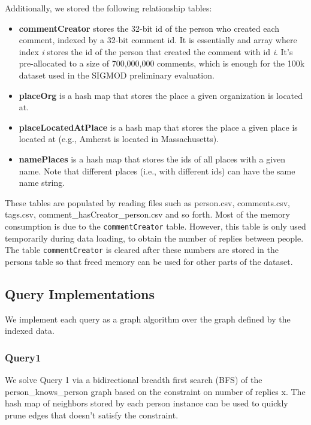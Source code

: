 \documentclass{article}
\begin{document}
Additionally, we stored the following relationship tables: 

\begin{itemize}
\item \textbf{commentCreator} stores the 32-bit id of the person who created each comment, indexed by a 32-bit comment id. It is essentially and array where index \emph{i} stores the id of the person that created the comment with id \emph{i}. It's pre-allocated to a size of 700,000,000 comments, which is enough for the 100k dataset used in the SIGMOD preliminary evaluation. 
\item \textbf{placeOrg} is a hash map that stores the place a given organization is located at.  
\item \textbf{placeLocatedAtPlace} is a hash map that stores the place a given place is located at (e.g., Amherst is located in Massachusetts).  
\item \textbf{namePlaces} is a hash map that stores the ids of all places with a given name. Note that different places (i.e., with different ids) can have the same name string.
\end{itemize}

These tables are populated by reading files such as person.csv,
comments.csv, tags.csv, comment\_hasCreator\_person.csv and so forth.
Most of the memory consumption is due to the \texttt{commentCreator}
table.  However, this table is only used temporarily during data
loading, to obtain the number of replies between people. The table
\texttt{commentCreator} is cleared after these numbers are stored in
the persons table so that freed memory can be used for other parts of
the dataset.

\subsection{Query Implementations}

We implement each query as a graph algorithm over the graph defined by
the indexed data.

\subsubsection{Query1}
We solve Query 1 via a bidirectional breadth first search (BFS) of the
person\_knows\_person graph based on the constraint on number of replies
x.  The hash map of neighbors stored by each person instance can be used
to quickly prune edges that doesn't satisfy the constraint. 
\end{document}
